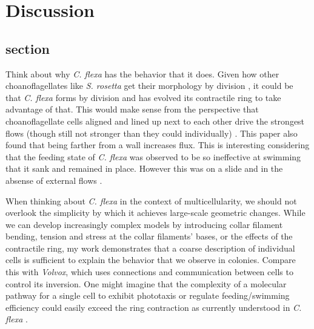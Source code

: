 
\chapter{Discussion} %

\ifpdf
    \graphicspath{{Chapter4/Figs/Raster/}{Chapter4/Figs/PDF/}{Chapter4/Figs/}}
\else
    \graphicspath{{Chapter4/Figs/Vector/}{Chapter4/Figs/}}
\fi


\section{section} 

Think about why \textit{C. flexa} has the behavior that it does. Given how other choanoflagellates like \textit{S. rosetta} get their morphology by division \citep{fairclough2010,larson2020}, it could be that \textit{C. flexa} forms by division and has evolved its contractile ring to take advantage of that. This would make sense from the perspective that choanoflagellate cells aligned and lined up next to each other drive the strongest flows (though still not stronger than they could individually) \citet{kirkegaard2016}. This paper also found that being farther from a wall increases flux. This is interesting considering that the feeding state of \textit{C. flexa} was observed to be so ineffective at swimming that it sank and remained in place. However this was on a slide and in the absense of external flows \citet{brunet2019}.

When thinking about \textit{C. flexa} in the context of multicellularity, we should not overlook the simplicity by which it achieves large-scale geometric changes. While we can develop increasingly complex models by introducing collar filament bending, tension and stress at the collar filaments' bases, or the effects of the contractile ring, my work demonstrates that a coarse description of individual cells is sufficient to explain the behavior that we observe in colonies. Compare this with \textit{Volvox}, which uses connections and communication between cells to control its inversion. One might imagine that the complexity of a molecular pathway for a single cell to exhibit phototaxis or regulate feeding/swimming efficiency could easily exceed the ring contraction as currently understood in \textit{C. flexa} \citep{brunet2019}. 


